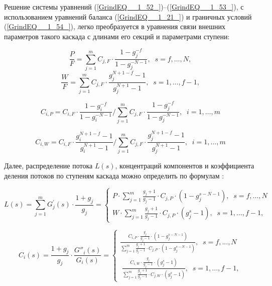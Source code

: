 Решение системы уравнений (\ref{GrindEQ__1_52_})--(\ref{GrindEQ__1_53_}), с использованием уравнений баланса (\ref{GrindEQ__1_21_}) и граничных условий (\ref{GrindEQ__1_54_}), легко преобразуется в уравнения связи внешних параметров такого каскада с длинами его секций и параметрами ступени:

\begin{equation} \label{GrindEQ__1_55_} 
  \frac{P}{F} =\sum _{j=1}^{m}C_{j,F} \cdot \frac{1-g_{j}^{-f} }{1-g_{j}^{-N-1}} ,\; \; s=f,...,N ,                                                  
  \end{equation} 
  \begin{equation} \label{GrindEQ__1_56_} 
  \frac{W}{F} =\sum _{j=1}^{m}C_{j,F} \cdot \frac{g_{j}^{N+1-f} -1}{g_{j}^{N+1} -1} ,\; \; s=1,...,f-1 ,                                            
\end{equation}

\begin{equation} \label{GrindEQ__1_57_} 
  C_{i,P}=C_{i,F} \cdot \frac{1-g_{i}^{-f}}{1-g_{i}^{-N-1}} / \sum_{j=1}^{m} C_{j,F} \cdot \frac{1-g_{j}^{-f}}{1-g_{j}^{-N-1}},\; \;  i=1, \ldots, m                             
\end{equation}

\begin{equation} \label{GrindEQ__1_58_} 
  C_{i,W}=C_{i,F} \cdot \frac{g_{i}^{N+1-f}-1}{g_{i}^{N+1}-1} / \sum_{j=1}^{m} C_{j,F} \cdot \frac{g_{j}^{N+1-f}-1}{g_{j}^{N+1}-1},\; \;  i=1, \ldots, m                         
\end{equation} 

Далее, распределение потока $L(s)$, концентраций компонентов и коэффициента деления потоков по ступеням каскада можно определить по формулам \cite{sulaberidzeTeoriyaKaskadovDlya2011}:

\begin{equation} \label{GrindEQ__1_59_} 
  L(s)=\sum_{j=1}^{m} G_{j}^{\prime}(s) \cdot \frac{1+g_{j}}{g_{j}}=\left\{\begin{array}{c}
  P \cdot \sum_{j=1}^{m} \frac{g_{j}+1}{g_{j}-1} \cdot C_{j,P} \cdot \left(1-g_{j}^{s-N-1}\right),\; \;  s=f, \ldots, N \\
  W \cdot \sum_{j=1}^{m} \frac{g_{j}+1}{g_{j}-1} \cdot C_{j,P} \cdot \left(g_{j}^{s}-1\right),\; \;  s=1, \ldots, f-1,
  \end{array}\right.
\end{equation} 

\begin{equation} \label{GrindEQ__1_60_} 
  C_{i} (s)=\frac{1+g_{j} }{g_{j} } \cdot \frac{G''_{i} (s)}{G_{i} (s)} =\left\{\begin{array}{l} {\frac{C_{i,P}\cdot \frac{g_{j} }{g_{j} -1}\cdot \left(1-g_{j}^{s-N-1} \right)}{\sum _{j=1}^{m}\frac{g_{j} +1}{g_{j} -1} \cdot C_{j,P} \cdot \left(1-g_{j}^{s-N-1} \right)} ,\; \; s=f,...,N} \\ {\; \frac{C_{i,W} \cdot \frac{g_{j} }{g_{j} -1} \cdot \left(g_{j}^{s} -1\right)}{\sum _{j=1}^{m}\frac{g_{j} +1}{g_{j} -1} \cdot C_{j,W} \cdot \left(g_{j}^{s} -1\right)} ,\; \; s=1,...,f-1,} \end{array}\right.  
\end{equation} 

